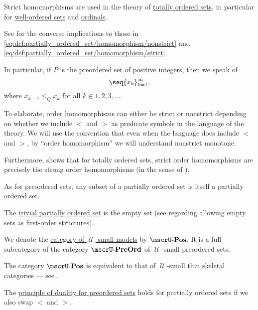 \begin{definition}
\begin{thmenum}[resume=def:partially_ordered_set]
    Strict homomorphisms are used in the theory of \hyperref[subsec:partially_ordered_sets]{totally ordered sets}, in particular for \hyperref[subsec:well_ordered_sets]{well-ordered sets} and \hyperref[subsec:ordinals]{ordinals}.

    See  for the converse implications to those in \eqref{eq:def:partially_ordered_set/homomorphism/nonstrict} and \eqref{eq:def:partially_ordered_set/homomorphism/strict}.

    In particular, if \( P \) is the preordered set of \hyperref[rem:peano_arithmetic_zero/nonnegative]{positive integers}, then we speak of 
    \begin{equation}\label{eq:def:partially_ordered_set/homomorphism/sequence}
      \seq{ x_k }_{k=1}^\infty,
    \end{equation}
    where \( x_{k-1} \leq_Q x_k \) for all \( k \in 1, 2, 3, \ldots \).

    To elaborate, order homomorphisms can either be strict or nonstrict depending on whether we include \( < \) and \( > \) as predicate symbols in the language of the theory. We will use the convention that even when the language does include \( < \) and \( > \), by \enquote{order homomorphism} we will understand nonstrict monotone.

    Furthermore,  shows that for totally ordered sets, strict order homomorphisms are precisely the strong order homomorphisms (in the sense of ).

     As for preordered sets, any subset of a partially ordered set is itself a partially ordered set.

     The \hyperref[thm:substructures_form_complete_lattice/bottom]{trivial partially ordered set} is the empty set (see  regarding allowing empty sets as first-order structures)..

     We denote the \hyperref[def:category_of_small_first_order_models]{category of \( \mscrU \)-small models} by \( \ucat{Pos} \). It is a full subcategory of the category \hyperref[def:preordered_set/category]{\( \ucat{PreOrd} \)} of \( \mscrU \)-small preordered sets.

    The category \( \ucat{Pos} \) is equivalent to that of \( \mscrU \)-small thin skeletal categories --- see .

     The \hyperref[def:preordered_set/duality]{principle of duality for preordered sets} holds for partially ordered sets if we also swap \( < \) and \( > \).
  \end{thmenum}
\end{definition}
